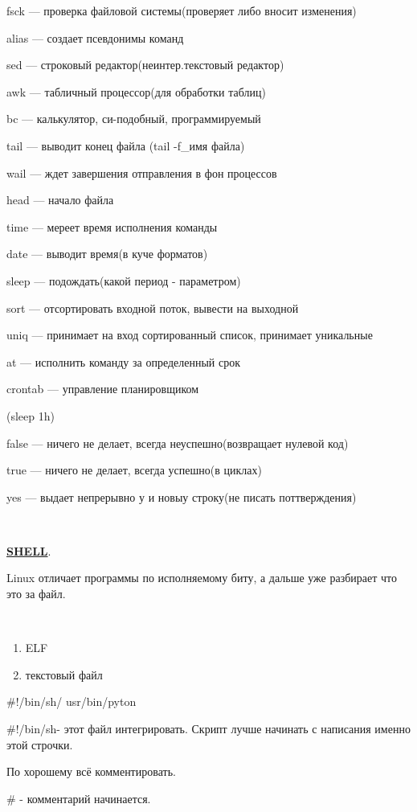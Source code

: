 \par 
fsck — проверка файловой системы(проверяет
либо вносит изменения)
\par 
alias — создает псевдонимы команд
\par 
sed — строковый редактор(неинтер.текстовый
редактор)
\par 
awk — табличный процессор(для обработки
таблиц)
\par 
bc — калькулятор, си-подобный, программируемый
\par 
tail — выводит конец файла (tail -f\_имя файла)
\par 
wail — ждет завершения отправления в фон
процессов
\par 
head — начало файла
\par 
time — мереет время исполнения команды
\par 
date — выводит время(в куче форматов)
\par 
sleep — подождать(какой период - параметром)
\par 
sort — отсортировать входной поток,
вывести на выходной
\par 
uniq — принимает на вход сортированный
список, принимает уникальные
\par 
at — исполнить команду за определенный
срок
\par 
crontab — управление планировщиком
\par 
(sleep 1h)
\par 
false — ничего не делает, всегда
неуспешно(возвращает нулевой код)
\par 
true — ничего не делает, всегда успешно(в
циклах)
\par 
yes — выдает непрерывно у и новыу строку(не
писать поттверждения)
\par 
\\

\par \underline{\textbf{SHELL}}.
\par 
Linux отличает программы по исполняемому
биту, а дальше уже разбирает что это за
файл.
\par 
\\

\begin{enumerate}
	\item \par 
	ELF
	\item \par 
	текстовый файл
\end{enumerate}
\par 
\#!/bin/sh/        usr/bin/pyton
\par 
\#!/bin/sh- этот файл интегрировать. Скрипт
лучше начинать с написания именно этой
строчки.
\par 
По хорошему всё комментировать.
\par 
\# - комментарий начинается.
\par 
\\

